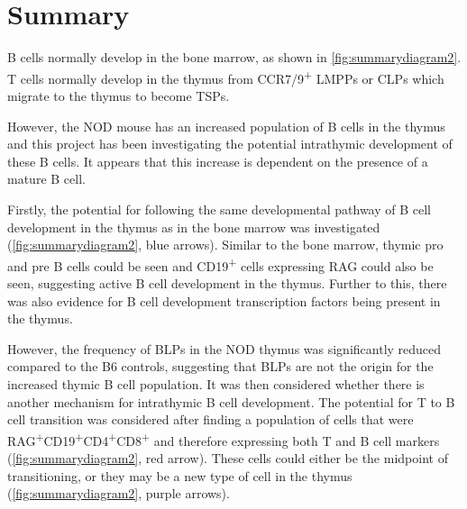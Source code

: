 





\section{Summary}

B cells normally develop in the bone marrow, as shown in \cref{fig:summarydiagram2}.
T cells normally develop in the thymus from CCR7/9\textsuperscript{+} LMPPs or CLPs which migrate to the thymus to become TSPs.

However, the NOD mouse has an increased population of B cells in the thymus and this project has been investigating the potential intrathymic development of these B cells.
It appears that this increase is dependent on the presence of a mature B cell.

Firstly, the potential for following the same developmental pathway of B cell development in the thymus as in the bone marrow was investigated (\cref{fig:summarydiagram2}, blue arrows).
Similar to the bone marrow, thymic pro and pre B cells could be seen and CD19\textsuperscript{+} cells expressing RAG could also be seen, suggesting active B cell development in the thymus.
Further to this, there was also evidence for B cell development transcription factors being present in the thymus.

However, the frequency of BLPs in the NOD thymus was significantly reduced compared to the B6 controls, suggesting that BLPs are not the origin for the increased thymic B cell population.
It was then considered whether there is another mechanism for intrathymic B cell development.
The potential for T to B cell transition was considered after finding a population of cells that were RAG\textsuperscript{+}CD19\textsuperscript{+}CD4\textsuperscript{+}CD8\textsuperscript{+} and therefore expressing both T and B cell markers (\cref{fig:summarydiagram2}, red arrow).
These cells could either be the midpoint of transitioning, or they may be a new type of cell in the thymus (\cref{fig:summarydiagram2}, purple arrows).

